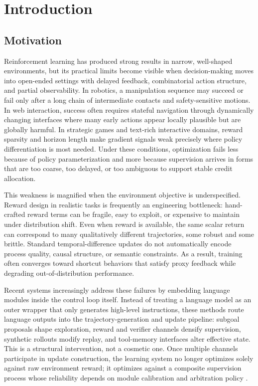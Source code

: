﻿\documentclass[conference]{IEEEtran}
\begin{document}
\section{Introduction}
\subsection{Motivation}
Reinforcement learning has produced strong results in narrow, well-shaped environments, but its practical limits become visible when decision-making moves into open-ended settings with delayed feedback, combinatorial action structure, and partial observability. In robotics, a manipulation sequence may succeed or fail only after a long chain of intermediate contacts and safety-sensitive motions. In web interaction, success often requires stateful navigation through dynamically changing interfaces where many early actions appear locally plausible but are globally harmful. In strategic games and text-rich interactive domains, reward sparsity and horizon length make gradient signals weak precisely where policy differentiation is most needed. Under these conditions, optimization fails less because of policy parameterization and more because supervision arrives in forms that are too coarse, too delayed, or too ambiguous to support stable credit allocation.

This weakness is magnified when the environment objective is underspecified. Reward design in realistic tasks is frequently an engineering bottleneck: hand-crafted reward terms can be fragile, easy to exploit, or expensive to maintain under distribution shift. Even when reward is available, the same scalar return can correspond to many qualitatively different trajectories, some robust and some brittle. Standard temporal-difference updates do not automatically encode process quality, causal structure, or semantic constraints. As a result, training often converges toward shortcut behaviors that satisfy proxy feedback while degrading out-of-distribution performance.

Recent systems increasingly address these failures by embedding language modules inside the control loop itself. Instead of treating a language model as an outer wrapper that only generates high-level instructions, these methods route language outputs into the trajectory-generation and update pipeline: subgoal proposals shape exploration, reward and verifier channels densify supervision, synthetic rollouts modify replay, and tool-memory interfaces alter effective state. This is a structural intervention, not a cosmetic one. Once multiple channels participate in update construction, the learning system no longer optimizes solely against raw environment reward; it optimizes against a composite supervision process whose reliability depends on module calibration and arbitration policy \cite{arxiv_p_2204_01691,doi_p_10_1109_icra48891_2023_10160591,arxiv_p_2305_16291,arxiv_p_2310_12931,arxiv_p_2404_03648,arxiv_p_2602_16165}.
\end{document}
